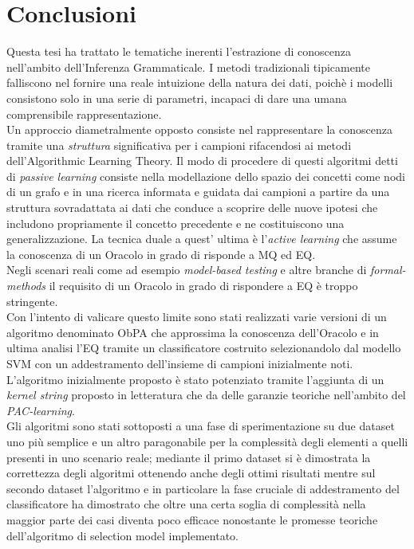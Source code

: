\chapter*{Conclusioni}
\label{cap:con}

Questa tesi ha trattato le tematiche inerenti l'estrazione di conoscenza nell'ambito dell'Inferenza Grammaticale. 
 I metodi tradizionali tipicamente falliscono nel fornire una reale intuizione della natura dei dati, poichè i modelli consistono solo in una serie di parametri, incapaci di dare una umana comprensibile rappresentazione. \\
 Un approccio diametralmente opposto consiste nel rappresentare la conoscenza tramite una \textit{struttura} significativa per i campioni rifacendosi ai metodi dell'Algorithmic Learning Theory. Il modo di procedere di questi algoritmi detti di \textit{passive learning} consiste nella modellazione dello spazio dei concetti come nodi di un grafo e in una ricerca informata e guidata dai campioni a partire da una struttura sovradattata ai dati che conduce a scoprire delle nuove ipotesi che includono propriamente il concetto precedente e ne costituiscono una generalizzazione.  La tecnica duale a quest' ultima è l'\textit{active learning} che assume la conoscenza di un Oracolo in grado di risponde a \ac{MQ} ed \ac{EQ}.\\ Negli scenari reali come ad esempio \textit{model-based testing} e altre branche di \textit{formal-methods} il requisito di un Oracolo in grado di rispondere a \ac{EQ} è troppo stringente.\\
 Con l'intento di valicare questo limite sono stati realizzati varie versioni di un algoritmo denominato \ac{ObPA} che approssima la conoscenza dell'Oracolo e in ultima analisi l'\ac{EQ} tramite un classificatore costruito selezionandolo dal modello \ac{SVM} con un addestramento dell'insieme di campioni inizialmente noti.\\
L'algoritmo inizialmente proposto è stato potenziato tramite l'aggiunta di un \textit{kernel string} proposto in letteratura che da delle garanzie teoriche nell'ambito del \textit{PAC-learning}.  \\
Gli algoritmi sono stati sottoposti a una fase di sperimentazione su due dataset uno più semplice e un altro paragonabile per la complessità  degli elementi a quelli presenti in uno scenario reale; mediante il primo dataset si è dimostrata la correttezza degli algoritmi ottenendo anche degli ottimi risultati mentre sul secondo dataset l'algoritmo e in particolare la fase cruciale di addestramento del classificatore ha dimostrato che oltre una certa soglia di complessità nella maggior parte dei casi diventa poco efficace nonostante le promesse teoriche  dell'algoritmo di selection model implementato.\\
